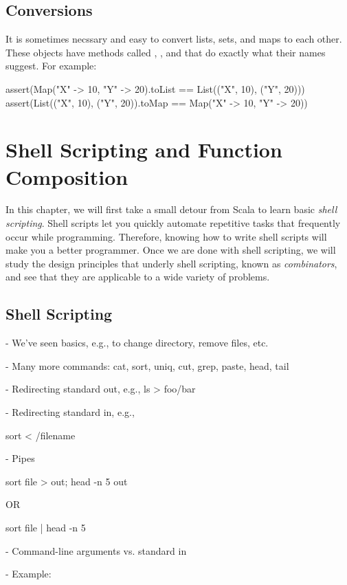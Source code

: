 \documentclass[9pt]{extbook}
\begin{document}
\section{Conversions}

It is sometimes necssary and easy to convert lists, sets, and maps to each
other. These objects have methods called ,
, and  that do exactly what their
names suggest. For example:
%
\begin{scalacode}
assert(Map("X" -> 10, "Y" -> 20).toList == List(("X", 10), ("Y", 20)))
assert(List(("X", 10), ("Y", 20)).toMap == Map("X" -> 10, "Y" -> 20))
\end{scalacode}

\chapter{Shell Scripting and Function Composition}

In this chapter, we will first take a small detour from Scala to learn basic
\emph{shell scripting}. Shell scripts let you quickly automate repetitive tasks
that frequently occur while programming. Therefore, knowing how to write shell
scripts will make you a better programmer. Once we are done with shell
scripting, we will study the design principles that underly shell scripting,
known as \emph{combinators}, and see that they are applicable to a wide variety
of problems.

\section{Shell Scripting}

- We've seen basics, e.g., to change directory, remove files, etc.

- Many more commands: cat, sort, uniq, cut, grep, paste, head, tail

- Redirecting standard out, e.g., ls > foo/bar

- Redirecting standard in, e.g., 

  sort < /filename

- Pipes

  sort file > out; head -n 5 out 

   OR

  sort file | head -n 5


- Command-line arguments vs. standard in

- Example:
\end{document}
